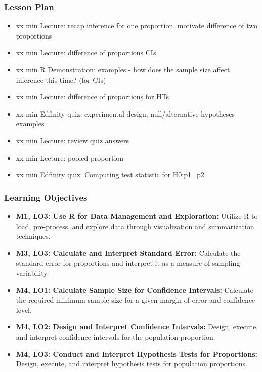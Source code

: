 \begin{frame}
    \frametitle{Lesson Plan}
    \begin{itemize}
        \item xx min Lecture: recap inference for one proportion, motivate difference of two proportions
        \item xx min Lecture: difference of proportions CIs
        \item xx min R Demonstration: examples - how does the sample size affect inference this time? (for CIs)
        \item xx min Lecture: difference of proportions for HTs
        \item xx min Edfinity quiz: experimental design, null/alternative hypotheses examples
        \item xx min Lecture: review quiz answers
        \item xx min Lecture: pooled proportion
        \item xx min Edfinity quiz: Computing test statistic for H0:p1=p2
    \end{itemize}
\end{frame}
            
\begin{frame}
    \frametitle{Learning Objectives}
    \begin{itemize}
        \item \textbf{M1, LO3: Use R for Data Management and Exploration:} Utilize R to load, pre-process, and explore data through visualization and summarization techniques.
        \item \textbf{M3, LO3: Calculate and Interpret Standard Error:} Calculate the standard error for proportions and interpret it as a measure of sampling variability.
        \item \textbf{M4, LO1: Calculate Sample Size for Confidence Intervals:} Calculate the required minimum sample size for a given margin of error and confidence level.
        \item \textbf{M4, LO2: Design and Interpret Confidence Intervals:} Design, execute, and interpret confidence intervals for the population proportion.
        \item \textbf{M4, LO3: Conduct and Interpret Hypothesis Tests for Proportions:} Design, execute, and interpret hypothesis tests for population proportions.
    \end{itemize}
\end{frame}
    
